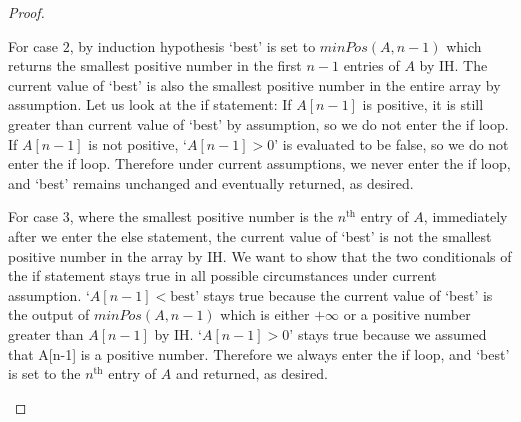 \documentclass{article}
\begin{document}
\begin{proof}
\begin{enumerate}
        For case $2$, by induction hypothesis `best' is set to $minPos(A,n-1)$ which returns the smallest positive number in the first $n-1$ entries of $A$ by IH. 
        The current value of `best' is also the smallest positive number in the entire array by assumption. Let us look at the if statement:
        If $A[n-1]$ is positive, it is still greater than current value of `best' by assumption, so we do not enter the if loop. If $A[n-1]$ is not positive, 
        `$A[n-1] > 0$' is evaluated to be false, so we do not enter the if loop. Therefore under current assumptions, we never enter the if loop, and `best' remains unchanged
        and eventually returned, as desired. 
        
        For case $3$, where the smallest positive number is the $n^{\text{th}}$ entry of $A$, immediately after we enter the else statement, the current value of `best'
        is not the smallest positive number in the array by IH. We want to show that the two conditionals of the if statement stays true in all possible circumstances under 
        current assumption. `$A[n-1] < \text{best}$' stays true because the current value of `best' is the output of $minPos(A,n-1)$ 
        which is either $+\infty$ or a positive number greater than $A[n-1]$ by IH. `$A[n-1] > 0$' stays true because we assumed that A[n-1] is a positive number. 
        Therefore we always enter the if loop, and `best' is set to the $n^{\text{th}}$ entry of $A$ and returned, as desired. 
        
      \end{enumerate} 
    \end{proof}
\end{document}
